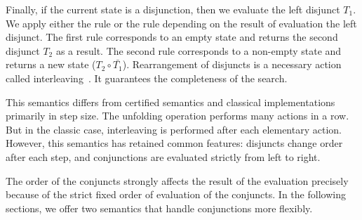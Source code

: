 Finally, if the current state is a disjunction, then we evaluate the left disjunct $T_1$. We apply either the  rule or the  rule depending on the result of evaluation the left disjunct. The first rule corresponds to an empty state and returns the second disjunct $T_2$ as a result. The second rule corresponds to a non-empty state and returns a new state ($T_2 \circ \bar{T_1}$). Rearrangement of disjuncts is a necessary action called interleaving~\cite{fair:interleaving}. It guarantees the completeness of the search.

This semantics differs from certified semantics and classical implementations primarily in step size. The unfolding operation performs many actions in a row. But in the classic case, interleaving is performed after each elementary action. However, this semantics has retained common features: disjuncts change order after each step, and conjunctions are evaluated strictly from left to right.

The order of the conjuncts strongly affects the result of the evaluation precisely because of the strict fixed order of evaluation of the conjuncts. In the following sections, we offer two semantics that handle conjunctions more flexibly.
